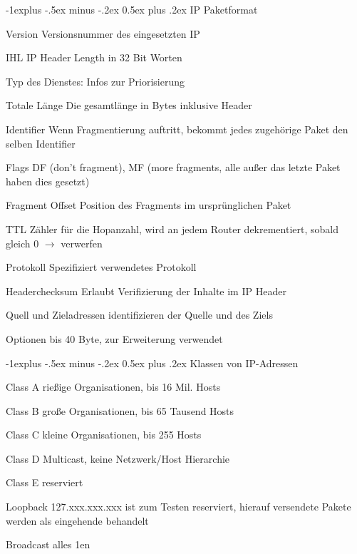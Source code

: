 \documentclass[a4paper]{article}
\makeatletter
\renewcommand{\subsection}{\@startsection{subsection}{2}{0mm}%
                                {-1explus -.5ex minus -.2ex}%
                                {0.5ex plus .2ex}%
                                {\normalfont\normalsize\bfseries}}
\makeatother
\begin{document}
\begin{multicols}{3}
    \subsection{IP Paketformat}
    \begin{description*}
        \item[Version] Versionsnummer des eingesetzten IP
        \item[IHL] IP Header Length in 32 Bit Worten
        \item[Typ] des Dienstes: Infos zur Priorisierung
        \item[Totale Länge] Die gesamtlänge in Bytes inklusive Header
        \item[Identifier] Wenn Fragmentierung auftritt, bekommt jedes zugehörige Paket den selben Identifier
        \item[Flags] DF (don't fragment), MF (more fragments, alle außer das letzte Paket haben dies gesetzt)
        \item[Fragment Offset] Position des Fragments im ursprünglichen Paket
        \item[TTL] Zähler für die Hopanzahl, wird an jedem Router dekrementiert, sobald gleich 0 $\rightarrow$ verwerfen
        \item[Protokoll] Spezifiziert verwendetes Protokoll
        \item[Headerchecksum] Erlaubt Verifizierung der Inhalte im IP Header
        \item[Quell und Zieladressen] identifizieren der Quelle und des Ziels
        \item[Optionen] bis 40 Byte, zur Erweiterung verwendet
    \end{description*}
    
    \subsection{Klassen von IP-Adressen}
    \begin{description*}
        \item[Class A] rießige Organisationen, bis 16 Mil. Hosts
        \item[Class B] große Organisationen, bis 65 Tausend Hosts
        \item[Class C] kleine Organisationen, bis 255 Hosts
        \item[Class D] Multicast, keine Netzwerk/Host Hierarchie
        \item[Class E] reserviert
        \item[Loopback] 127.xxx.xxx.xxx ist zum Testen reserviert, hierauf versendete Pakete werden als eingehende behandelt
        \item[Broadcast] alles 1en
    \end{description*}
    

\end{multicols}
\end{document}
